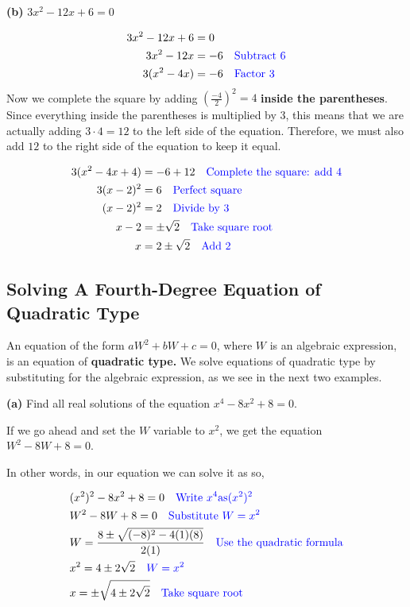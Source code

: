 \textbf{(b)} $3x^2-12x+6=0$

\begin{align*}
    3x^2-12x+6&=0 \\
    3x^2-12x&=-6 \quad  \color{blue}\text{Subtract 6} \\ 
    3(x^2-4x)&=-6 \quad \color{blue}\text{Factor 3}\\
\end{align*}
Now we complete the square by adding $\displaystyle\left(\frac{-4}{2}\right)^2=4$ \textbf{inside the parentheses}. Since everything inside the parentheses is multiplied by 3, this means that we are actually adding $3\cdot4=12$ to the left side of the equation. Therefore, we must also add $12$ to the right side of the equation to keep it equal.

\begin{align*}
    3(x^2-4x+4)&=-6+12 \quad \color{blue}\text{Complete the square: add} \ 4 \\
    3(x-2)^2&=6 \quad  \color{blue}\text{Perfect square} \\
    (x-2)^2&=2 \quad  \color{blue}\text{Divide by 3} \\
    x-2&=\pm\sqrt{2} \quad  \color{blue}\text{Take square root} \\
    x&=2\pm\sqrt{2} \quad  \color{blue}\text{Add 2}
\end{align*}

\subsection{Solving A Fourth-Degree Equation of Quadratic Type}
An equation of the form $aW^2+bW+c=0$, where $W$ is an algebraic expression,
is an equation of \textbf{quadratic type.} We solve equations of quadratic type by substituting
for the algebraic expression, as we see in the next two examples. 

\textbf{(a)} Find all real solutions of the equation $x^4-8x^2+8=0$.

If we go ahead and set the $W$ variable to $x^2$, we get the equation $W^2-8W+8=0$.

In other words, in our equation we can solve it as so,


\begin{align*}
   &(x^2)^2-8x^2+8=0 \quad \color{blue}\text{Write} \ x^4 \text{as} (x^2)^2 \\
   &W^2-8W+8=0 \quad \color{blue}\text{Substitute} \ W=x^2 \\
   &W=\frac{8\pm\sqrt{(-8)^2-4(1)(8)}}{2(1)} \quad \color{blue}\text{Use the quadratic formula} \\
   &x^2=4\pm2\sqrt{2} \quad \color{blue}W=x^2 \\
   &x=\pm\sqrt{4\pm2\sqrt{2}} \quad \color{blue}\text{Take square root} \\
\end{align*}

